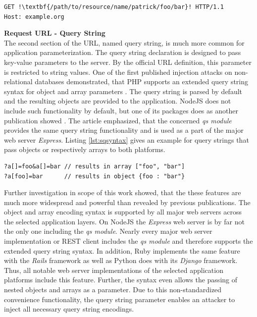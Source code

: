 \begin{lstlisting}[escapechar=!, caption={Example for GET request}, label={lst:http_request_example}]
GET !\textbf{/path/to/resource/name/patrick/foo/bar}! HTTP/1.1
Host: example.org
\end{lstlisting}

\textbf{Request URL - Query String}\\
The second section of the URL, named query string, is much more common for application parameterization. The query string declaration is designed to pass key-value parameters to the server. By the official URL definition, this parameter is restricted to string values. One of the first published injection attacks on non-relational databases demonstrated, that PHP supports an extended query string syntax for object and array parameters \cite{Sullivan:2011}. The query string is parsed by default and the resulting objects are provided to the application. NodeJS does not include such functionality by default, but one of its packages does as another publication showed \cite{Petkov:2014a}. The article emphasized, that the concerned \textit{qs module} provides the same query string functionality and is used as a part of the major web server \textit{Express}. Listing \ref{lst:sqsyntax} gives an example for query strings that pass objects or respectively arrays to both platforms. \\

\begin{lstlisting}[caption={Examples for extended query string syntax}, label={lst:sqsyntax}]
?a[]=foo&a[]=bar // results in array ["foo", "bar"]
?a[foo]=bar      // results in object {foo : "bar"}
\end{lstlisting}

Further investigation in scope of this work showed, that the these features are much more widespread and powerful than revealed by previous publications. The object and array encoding syntax is supported by all major web servers across the selected application layers. On NodeJS the \textit{Express} web server is by far not the only one including the \textit{qs module}. Nearly every major web server implementation or REST client includes the \textit{qs module} and therefore supports the extended query string syntax. In addition, Ruby implements the same feature with the \textit{Rails} framework as well as Python does with its \textit{Django} framework. Thus, all notable web server implementations of the selected application platforms include this feature. Further, the syntax even allows the passing of nested objects and arrays as a parameter. Due to this non-standardized convenience functionality, the query string parameter enables an attacker to inject all necessary query string encodings. \\

